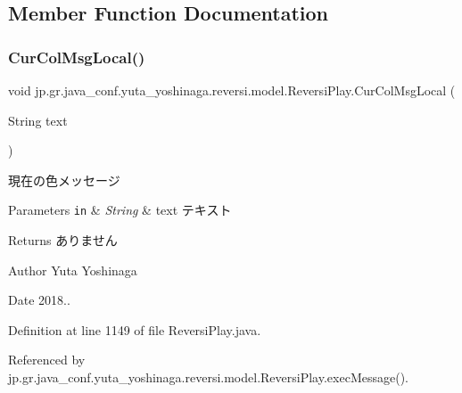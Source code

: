\subsection{Member Function Documentation}
\mbox{\label{classjp_1_1gr_1_1java__conf_1_1yuta__yoshinaga_1_1reversi_1_1model_1_1_reversi_play_a0dec187d4c4372a3470fac8e341ae9e8}} 
\subsubsection{\texorpdfstring{Cur\+Col\+Msg\+Local()}{CurColMsgLocal()}}
{\footnotesize\ttfamily void jp.\+gr.\+java\+\_\+conf.\+yuta\+\_\+yoshinaga.\+reversi.\+model.\+Reversi\+Play.\+Cur\+Col\+Msg\+Local (\begin{DoxyParamCaption}\item[{String}]{text }\end{DoxyParamCaption})\hspace{0.3cm}{\ttfamily [private]}}



現在の色メッセージ 


\begin{DoxyParams}[1]{Parameters}
\mbox{\tt in}  & {\em String} & text テキスト \\
\hline
\end{DoxyParams}
\begin{DoxyReturn}{Returns}
ありません 
\end{DoxyReturn}
\begin{DoxyAuthor}{Author}
Yuta Yoshinaga 
\end{DoxyAuthor}
\begin{DoxyDate}{Date}
2018.. 
\end{DoxyDate}


Definition at line 1149 of file Reversi\+Play.\+java.



Referenced by jp.\+gr.\+java\+\_\+conf.\+yuta\+\_\+yoshinaga.\+reversi.\+model.\+Reversi\+Play.\+exec\+Message().

